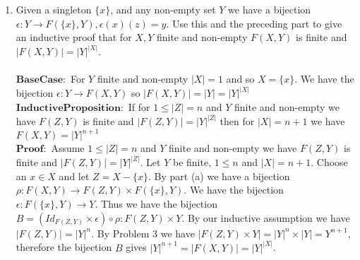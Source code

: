 \documentclass[11pt]{article}
\begin{document}
\begin{enumerate}
\begin{enumerate}
\item Given a singleton $\{x\}$, and any non-empty set $Y$ we have a bijection $\epsilon : Y \to F(\{x\}, Y), \epsilon(x)(z) = y$.  Use this and the preceding part to give an inductive proof that for $X, Y$ finite and non-empty $F(X,Y)$ is finite and $|F(X,Y)| = |Y|^{|X|}$.\\\\
$\mathbf{Base Case:}$ For $Y$ finite and non-empty $|X| = 1$ and so $X = \{x\}$.  We have the bijection $\epsilon : Y \to F(X,Y)$ so $|F(X,Y)| = |Y| = |Y|^{|X|}$\\
$\mathbf{Inductive Proposition:}$ If for $1 \leq |Z| = n$ and $Y$ finite and non-empty we have $F(Z,Y)$ is finite and $|F(Z,Y)| = |Y|^{|Z|}$ then for $|X| = n+1$ we have $F(X,Y) = |Y|^{n+1}$ \\
$\mathbf{Proof:}$ Assume $1 \leq |Z| = n$ and $Y$ finite and non-empty we have $F(Z,Y)$ is finite and $|F(Z,Y)| = |Y|^{|Z|}$.  Let $Y$ be finite, $1 \leq n$ and $|X| = n+1$.  Choose an $x \in X$ and let $Z = X - \{x\}$.  By part (a) we have a bijection $\rho : F(X,Y) \to F(Z,Y) \times F(\{x\},Y)$.  We have the bijection $\epsilon : F(\{x\},Y) \to Y$.  Thus we have the bijection $B = (Id_{F(Z,Y)} \times \epsilon) \circ \rho :F(Z,Y) \times Y$.  By our inductive assumption we have $|F(Z,Y)| = |Y|^n$.  By Problem 3 we have $|F(Z,Y) \times Y| = |Y|^n \times |Y| = Y^{n+1}$, therefore the bijection $B$ gives $|Y|^{n+1} = |F(X,Y)| = |Y|^{|X|}$.
\end{enumerate}

\end{enumerate} %
\end{document}
